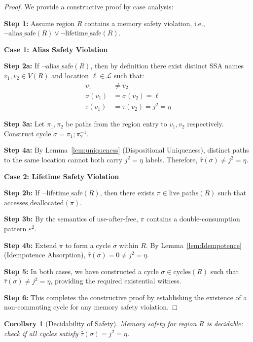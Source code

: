 \documentclass[acmsmall,anonymous,review,screen]{acmart}
\newtheorem{corollary}{Corollary}
\begin{document}
	\begin{proof}
		We provide a constructive proof by case analysis:
		
		\textbf{Step 1:} Assume region $R$ contains a memory safety violation, i.e., $\neg\text{alias\_safe}(R) \lor \neg\text{lifetime\_safe}(R)$.
		
		\textbf{Case 1: Alias Safety Violation}
		
		\textbf{Step 2a:} If $\neg\text{alias\_safe}(R)$, then by definition there exist distinct SSA names $v_1, v_2 \in V(R)$ and location $\ell \in \mathcal{L}$ such that:
		\begin{align}
			v_1 &\neq v_2 \\
			\sigma(v_1) &= \sigma(v_2) = \ell \\
			\tau(v_1) &= \tau(v_2) = j^{2} = \eta
		\end{align}
		
		\textbf{Step 3a:} Let $\pi_1, \pi_2$ be paths from the region entry to $v_1, v_2$ respectively. Construct cycle $\sigma = \pi_1; \pi_2^{-1}$.
		
		\textbf{Step 4a:} By Lemma~\ref{lem:uniqueness} (Dispositional Uniqueness), distinct paths to the same location cannot both carry $j^{2} = \eta$ labels. Therefore, $\hat{\tau}(\sigma) \neq j^{2} = \eta$.
		
		\textbf{Case 2: Lifetime Safety Violation}
		
		\textbf{Step 2b:} If $\neg\text{lifetime\_safe}(R)$, then there exists $\pi \in \text{live\_paths}(R)$ such that $\text{accesses\_deallocated}(\pi)$.
		
		\textbf{Step 3b:} By the semantics of use-after-free, $\pi$ contains a double-consumption pattern $\varepsilon^2$.
		
		\textbf{Step 4b:} Extend $\pi$ to form a cycle $\sigma$ within $R$. By Lemma~\ref{lem:Idempotence} (Idempotence Absorption), $\hat{\tau}(\sigma) = 0 \neq j^{2} = \eta$.
		
		\textbf{Step 5:} In both cases, we have constructed a cycle $\sigma \in \text{cycles}(R)$ such that $\hat{\tau}(\sigma) \neq j^{2} = \eta$, providing the required existential witness.
		
		\textbf{Step 6:} This completes the constructive proof by establishing the existence of a non-commuting cycle for any memory safety violation.
	\end{proof}
	
	\begin{corollary}[Decidability of Safety]
		Memory safety for region $R$ is decidable: check if all cycles satisfy $\hat{\tau}(\sigma) = j^{2} = \eta$.
	\end{corollary}
	
\end{document}
